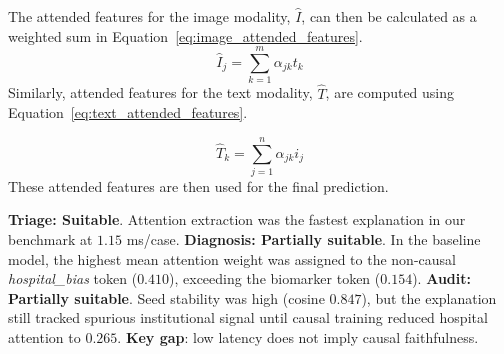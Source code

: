 \documentclass[pdflatex,sn-mathphys-num]{sn-jnl}%
\theoremstyle{thmstyleone}%
\theoremstyle{thmstyletwo}%
\theoremstyle{thmstylethree}%
\begin{document}
\begin{itemize}
\begin{itemize}
    The attended features for the image modality, \( \hat{I} \), can then be calculated as a weighted sum in Equation~\eqref{eq:image_attended_features}.
\begin{equation}
     \hat{I}_j = \sum_{k=1}^{m} \alpha_{jk} t_k 
\label{eq:image_attended_features}
\end{equation}
    Similarly, attended features for the text modality, \( \hat{T} \), are computed using Equation~\eqref{eq:text_attended_features}.

\begin{equation}
     \hat{T}_k = \sum_{j=1}^{n} \alpha_{jk} i_j 
\label{eq:text_attended_features}
\end{equation}
    These attended features are then used for the final prediction.
    
    \begin{tcolorbox}[colback=green!5,colframe=green!50!black,title=\textbf{Clinical Suitability Assessment: Attention}]
    \textbf{Triage: Suitable}. Attention extraction was the fastest explanation in our benchmark at $1.15$ ms/case. \textbf{Diagnosis: Partially suitable}. In the baseline model, the highest mean attention weight was assigned to the non-causal \textit{hospital\_bias} token ($0.410$), exceeding the biomarker token ($0.154$). \textbf{Audit: Partially suitable}. Seed stability was high (cosine $0.847$), but the explanation still tracked spurious institutional signal until causal training reduced hospital attention to $0.265$. \textbf{Key gap}: low latency does not imply causal faithfulness.
    \end{tcolorbox}

    

\end{itemize}
\end{itemize}
\end{document}
